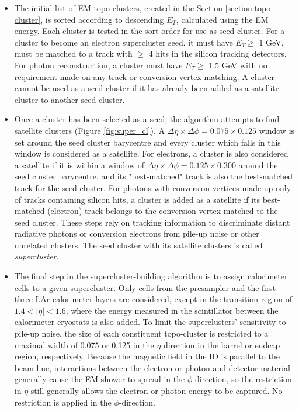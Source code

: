 \documentclass[a4paper, oneside, 11pt, openright]{book}
\begin{document}
			\begin{itemize}
				\item The initial list of EM topo-clusters, created in the Section \ref{section:topo cluster}, is sorted according to descending $E_T$, calculated using the EM energy. Each cluster is tested in the sort order for use as seed cluster. For a cluster to become an electron supercluster seed, it must have $E_T \geq$ 1 GeV, must be matched to a track with $\geq$ 4 hits in the silicon tracking detectors. For
				photon reconstruction, a cluster must have $E_T \geq$ 1.5 GeV with no requirement made on any track or conversion vertex matching. A cluster cannot be used as a seed cluster if it has already been added as a satellite cluster to another seed cluster.
				\item Once a cluster has been selected as a seed, the algorithm attempts to find satellite clusters (Figure \ref{fig:super_cl}). A $\Delta\eta\times\Delta\phi = 0.075 \times 0.125$ window is set around the seed cluster barycentre and every cluster which falls in this window is considered as a satellite. For electrons, a cluster is also considered a satellite if it is within a window of $\Delta\eta\times\Delta\phi = 0.125 \times 0.300$ around the seed cluster barycentre, and its "best-matched" track is also the best-matched track for the seed cluster. For photons with conversion vertices made up only of tracks containing silicon hits, a cluster is added as a satellite if its best-matched (electron) track belongs to the conversion vertex matched to the seed cluster. These steps rely on tracking information to discriminate distant radiative photons or conversion electrons from pile-up noise or other unrelated clusters. The seed cluster with its satellite clusters is called \textit{supercluster}.
				\item The final step in the
				supercluster-building algorithm is to assign calorimeter cells to a given supercluster. Only cells from the presampler and the first three LAr calorimeter layers are considered, except in the transition region of $1.4 < |\eta| < 1.6$, where the energy measured in the scintillator between the calorimeter cryostats is also added. To limit the superclusters’ sensitivity to pile-up noise, the size of each constituent topo-cluster is restricted to a maximal width of 0.075 or 0.125 in the $\eta$ direction in the barrel or endcap region, respectively. Because the magnetic field in the ID is parallel to the beam-line, interactions between the electron or photon and detector material generally cause the EM shower to spread in the $\phi$ direction, so the restriction in $\eta$ still generally allows the electron or photon energy to be captured. No restriction is applied in the $\phi$-direction.
			\end{itemize}
			
\end{document}
